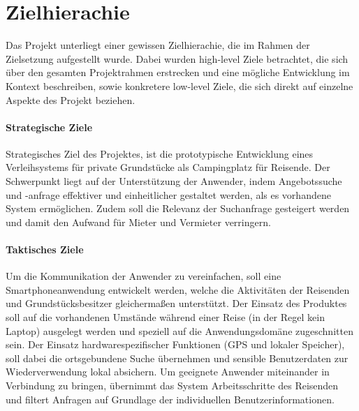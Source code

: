 
\chapter{Zielhierachie}
Das Projekt unterliegt einer gewissen Zielhierachie, die im Rahmen der Zielsetzung aufgestellt wurde. Dabei wurden high-level Ziele betrachtet, die sich über den gesamten Projektrahmen erstrecken und eine mögliche Entwicklung im Kontext beschreiben, sowie konkretere low-level Ziele, die sich direkt auf einzelne Aspekte des Projekt beziehen.

\subsubsection{Strategische Ziele}
Strategisches Ziel des Projektes, ist die prototypische Entwicklung eines Verleihsystems für private Grundstücke als Campingplatz für Reisende. Der Schwerpunkt liegt auf der Unterstützung der Anwender, indem Angebotssuche und -anfrage effektiver und einheitlicher gestaltet werden, als es vorhandene System ermöglichen. Zudem soll die Relevanz der Suchanfrage gesteigert werden und damit den Aufwand für Mieter und Vermieter verringern. 

\subsubsection{Taktisches Ziele}
Um die Kommunikation der Anwender zu vereinfachen, soll eine Smartphoneanwendung entwickelt werden, welche die Aktivitäten der Reisenden und Grundstücksbesitzer gleichermaßen unterstützt. Der Einsatz des Produktes soll auf die vorhandenen Umstände während einer Reise (in der Regel kein Laptop) ausgelegt werden und speziell auf die Anwendungsdomäne zugeschnitten sein. Der Einsatz hardwarespezifischer Funktionen (GPS und lokaler Speicher), soll dabei die ortsgebundene Suche übernehmen und sensible Benutzerdaten zur Wiederverwendung lokal absichern. Um geeignete Anwender miteinander in Verbindung zu bringen, übernimmt das System Arbeitsschritte des Reisenden und filtert Anfragen auf Grundlage der individuellen Benutzerinformationen.

